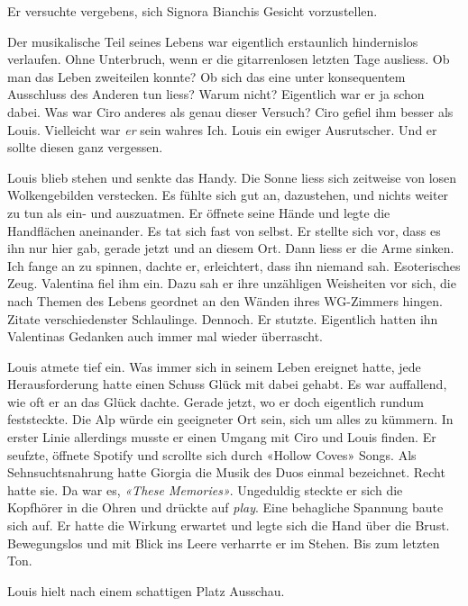 Er versuchte vergebens, sich Signora Bianchis Gesicht vorzustellen.

Der musikalische Teil seines Lebens war eigentlich erstaunlich 
hindernislos verlaufen. Ohne Unterbruch, wenn er die gitarrenlosen
letzten Tage ausliess. 
Ob man das Leben zweiteilen konnte? Ob sich das eine unter konsequentem Ausschluss des
Anderen tun liess? Warum nicht? Eigentlich war er ja schon dabei. Was war
Ciro anderes als genau dieser Versuch? Ciro gefiel ihm besser als Louis.
Vielleicht war \emph{er} sein wahres Ich. Louis ein ewiger Ausrutscher.
Und er sollte diesen ganz vergessen. 

Louis blieb stehen und senkte das Handy. Die Sonne
liess sich zeitweise von losen Wolkengebilden verstecken. Es fühlte sich gut an, dazustehen,
und nichts weiter zu tun als ein- und auszuatmen. Er öffnete seine Hände und legte die Handflächen 
aneinander. Es tat sich fast von selbst. Er stellte sich vor, dass es
ihn nur hier gab, gerade jetzt und an diesem Ort. Dann liess
er die Arme sinken. Ich fange an zu spinnen, dachte er, erleichtert,
dass ihn niemand sah. Esoterisches Zeug. Valentina fiel ihm ein. Dazu sah er ihre
unzähligen Weisheiten vor sich, die nach Themen des Lebens geordnet an
den Wänden ihres WG-Zimmers hingen. Zitate verschiedenster Schlaulinge.
Dennoch. Er stutzte. Eigentlich hatten ihn Valentinas Gedanken auch immer mal
wieder überrascht.

Louis atmete tief ein. Was immer sich in seinem Leben ereignet hatte, jede Herausforderung hatte einen Schuss Glück mit dabei gehabt. Es war auffallend, wie oft er an das Glück dachte. Gerade jetzt, wo er doch eigentlich rundum feststeckte. 
Die Alp würde ein geeigneter Ort sein, sich um alles zu kümmern. In erster
Linie allerdings musste er einen Umgang mit Ciro und Louis finden.
Er seufzte, öffnete Spotify und scrollte sich durch «Hollow
Coves» Songs. Als Sehnsuchtsnahrung hatte Giorgia die Musik des Duos
einmal bezeichnet. Recht hatte sie. Da war es, \emph{«These
Memories»}. Ungeduldig steckte er sich die Kopfhörer in die Ohren und
drückte auf \emph{play}. Eine behagliche Spannung baute sich auf. Er
hatte die Wirkung erwartet und legte sich die Hand über die Brust. Bewegungslos und mit Blick ins Leere verharrte er im Stehen. Bis zum letzten Ton.


Louis hielt nach einem schattigen Platz Ausschau. 
